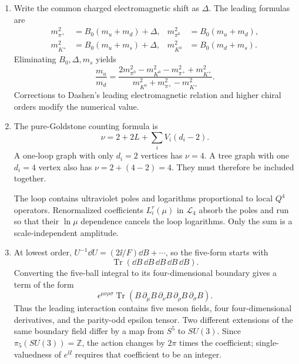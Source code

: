 \begin{enumerate}
  \begin{enumerate}
    \item[(a)]
    Write the common charged electromagnetic shift as \(\Delta\).
    The leading formulas are
    \[
    \begin{aligned}
      m_{\pi^+}^2&=B_0(m_u+m_d)+\Delta,&
      m_{\pi^0}^2&=B_0(m_u+m_d),\\
      m_{K^+}^2&=B_0(m_u+m_s)+\Delta,&
      m_{K^0}^2&=B_0(m_d+m_s).
    \end{aligned}
    \]
    Eliminating \(B_0,\Delta,m_s\) yields
    \[
      \boxed{
      \frac{m_u}{m_d}
        =\frac{
         2m_{\pi^0}^2-m_{K^0}^2-m_{\pi^+}^2+m_{K^+}^2}
        {m_{K^0}^2+m_{\pi^+}^2-m_{K^+}^2}.}
    \]
    Corrections to Dashen's leading electromagnetic relation and higher
    chiral orders modify the numerical value.
    \item[(b)]
    The pure-Goldstone counting formula is
    \[
      \nu=2+2L+\sum_iV_i(d_i-2).
    \]
    A one-loop graph with only \(d_i=2\) vertices has \(\nu=4\).  A tree
    graph with one \(d_i=4\) vertex also has
    \(\nu=2+(4-2)=4\).  They must therefore be included together.

    The loop contains ultraviolet poles and logarithms proportional to
    local \(Q^4\) operators.  Renormalized coefficients \(L_i^r(\mu)\) in
    \(\mathcal L_4\) absorb the poles and run so that their
    \(\ln\mu\) dependence cancels the loop logarithms.  Only the sum is a
    scale-independent amplitude.
    \item[(c)]
    At lowest order,
    \(U^{-1}\dd U=(2\ii/F)\dd B+\cdots\), so the five-form starts with
    \[
      \operatorname{Tr}(\dd B\,\dd B\,\dd B\,\dd B\,\dd B).
    \]
    Converting the five-ball integral to its four-dimensional boundary
    gives a term of the form
    \[
      \epsilon^{\mu\nu\rho\sigma}
        \operatorname{Tr}
        (B\,\partial_\mu B\,\partial_\nu B\,
         \partial_\rho B\,\partial_\sigma B).
    \]
    Thus the leading interaction contains five meson fields, four
    four-dimensional derivatives, and the parity-odd epsilon tensor.
    Two different extensions of the same boundary field differ by a map
    from \(S^5\) to \(SU(3)\).  Since \(\pi_5(SU(3))=\mathbb Z\), the action
    changes by \(2\pi\) times the coefficient; single-valuedness of
    \(e^{\ii I}\) requires that coefficient to be an integer.
  \end{enumerate}


\end{enumerate}
